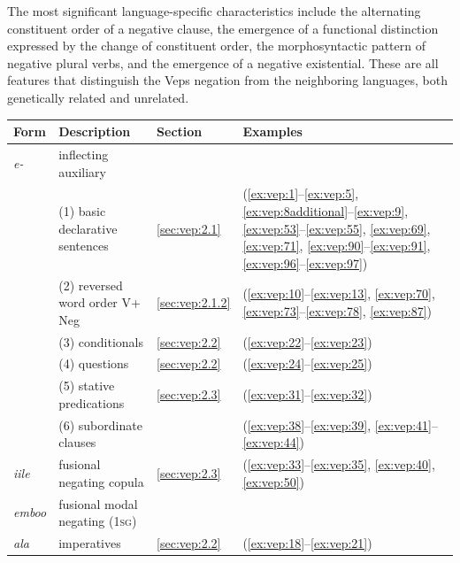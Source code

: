 \documentclass[output=paper,colorlinks=true, citecolor=brown]{langscibook}
\begin{document}
The most significant language-specific characteristics include the alternating constituent order of a negative clause, the emergence of a functional distinction expressed by the change of constituent order, the morphosyntactic pattern of negative plural verbs, and the emergence of a negative existential. These are all features that distinguish the Veps negation from the neighboring languages, both genetically related and unrelated.


\begin{table}
    \begin{tabularx}{\textwidth}{lQlp{25mm}}
\lsptoprule
Form & Description & Section & Examples \\
\midrule
\textit{e-} & inflecting auxiliary &&\\
&(1) basic declarative sentences 
& \ref{sec:vep:2.1}
 & (\ref{ex:vep:1}--\ref{ex:vep:5}, \ref{ex:vep:8additional}--\ref{ex:vep:9}, \ref{ex:vep:53}--\ref{ex:vep:55}, \ref{ex:vep:69}, \ref{ex:vep:71}, \ref{ex:vep:90}--\ref{ex:vep:91}, \ref{ex:vep:96}--\ref{ex:vep:97}) \\ 

&(2) reversed word order V+ Neg 
 & \ref{sec:vep:2.1.2}
 & (\ref{ex:vep:10}--\ref{ex:vep:13}, \ref{ex:vep:70}, \ref{ex:vep:73}--\ref{ex:vep:78}, \ref{ex:vep:87})  \\ 

&(3) conditionals 
 & \ref{sec:vep:2.2}
 & (\ref{ex:vep:22}--\ref{ex:vep:23})  \\ 

&(4) questions 
 & \ref{sec:vep:2.2}
 & (\ref{ex:vep:24}--\ref{ex:vep:25})  \\ 

&(5) stative predications 
 & \ref{sec:vep:2.3}
 & (\ref{ex:vep:31}--\ref{ex:vep:32})  \\

&(6) subordinate clauses 
&
& (\ref{ex:vep:38}--\ref{ex:vep:39}, \ref{ex:vep:41}--\ref{ex:vep:44})  \\

\textit{iile} &fusional negating copula 
& \ref{sec:vep:2.3}
& (\ref{ex:vep:33}--\ref{ex:vep:35}, \ref{ex:vep:40}, \ref{ex:vep:50})  \\

\textit{emboo}  & fusional modal negating (\textsc{1sg})  &&\\
	
\textit{ala} & imperatives
& \ref{sec:vep:2.2}
& (\ref{ex:vep:18}--\ref{ex:vep:21})  \\


\end{tabularx}
\end{table}
\end{document}
